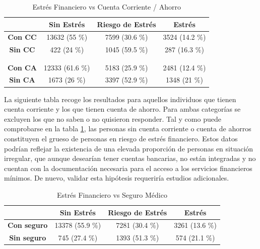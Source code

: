 \documentclass[a4paper, 11pt]{article}
\begin{document}
\begin{table}[ht]
\centering
\begin{tabular}{cccc}
\toprule
 & \textbf{Sin Estrés} & \textbf{Riesgo de Estrés} & \textbf{Estrés}\\
\midrule
\textbf{Con CC} & 13632 (55 \%) &	7599 (30.6 \%) &	3524 (14.2 \%)\\
\textbf{Sin CC} & 422 (24 \%) &	1045 (59.5 \%) &	287 (16.3 \%)\\
& & & \\
\hline
& & & \\
\textbf{Con CA} & 12333 (61.6 \%) &	5183 (25.9 \%) &	2481 (12.4 \%)\\
\textbf{Sin CA} & 1673 (26 \%) &	3397 (52.9 \%) &	1348 (21 \%)\\
\bottomrule
\end{tabular}
\caption{Estrés Financiero vs Cuenta Corriente / Ahorro}
\label{tab:stress_vs_banking}
\end{table}

La siguiente tabla recoge los resultados para aquellos individuos que tienen
cuenta corriente y los que tienen cuenta de ahorro. Para ambas categorías se 
excluyen los que no saben o no quisieron responder. Tal y como puede comprobarse
en la tabla \ref{tab:stress_vs_banking}, las personas sin cuenta corriente o 
cuenta de ahorros constituyen el grueso de personas en riesgo de estrés financiero.
Estos datos podrían reflejar la existencia de una elevada proporción de personas
en situación irregular, que aunque desearían tener cuentas bancarias, no están 
integradas y no cuentan con la documentación necesaria para el acceso a los 
servicios financieros mínimos. De nuevo, validar esta hipótesis requeriría estudios
adicionales.

\begin{table}[ht]
\centering
\begin{tabular}{cccc}
\toprule
 & \textbf{Sin Estrés} & \textbf{Riesgo de Estrés} & \textbf{Estrés}\\
\midrule
\textbf{Con seguro } & 13378 (55.9 \%) &	7281 (30.4 \%) &	3261 (13.6 \%)\\
\textbf{Sin seguro } & 745 (27.4 \%) &	1393 (51.3 \%) &	574 (21.1 \%)\\
\bottomrule
\end{tabular}
\caption{Estrés Financiero vs Seguro Médico}
\label{tab:stress_vs_health_insurance}
\end{table}
\end{document}
